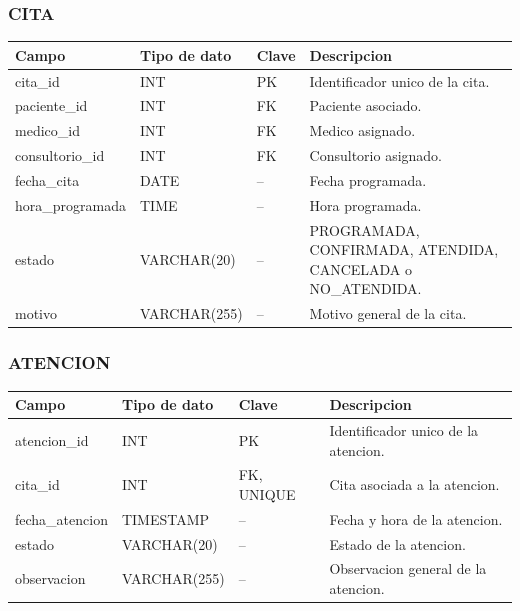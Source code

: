 \documentclass[11pt,letterpaper]{article}
\begin{document}
\subsubsection*{CITA}
\begin{center}
\small
\begin{tabularx}{\textwidth}{@{}p{3.2cm}p{3cm}p{2cm}Y@{}}
  \toprule
  \textbf{Campo} & \textbf{Tipo de dato} & \textbf{Clave} & \textbf{Descripcion} \\
  \midrule
  cita\_id & INT & PK & Identificador unico de la cita. \\
  paciente\_id & INT & FK & Paciente asociado. \\
  medico\_id & INT & FK & Medico asignado. \\
  consultorio\_id & INT & FK & Consultorio asignado. \\
  fecha\_cita & DATE & -- & Fecha programada. \\
  hora\_programada & TIME & -- & Hora programada. \\
  estado & VARCHAR(20) & -- & PROGRAMADA, CONFIRMADA, ATENDIDA, CANCELADA o NO\_ATENDIDA. \\
  motivo & VARCHAR(255) & -- & Motivo general de la cita. \\
  \bottomrule
\end{tabularx}
\end{center}

\subsubsection*{ATENCION}
\begin{center}
\small
\begin{tabularx}{\textwidth}{@{}p{3.2cm}p{3cm}p{2cm}Y@{}}
  \toprule
  \textbf{Campo} & \textbf{Tipo de dato} & \textbf{Clave} & \textbf{Descripcion} \\
  \midrule
  atencion\_id & INT & PK & Identificador unico de la atencion. \\
  cita\_id & INT & FK, UNIQUE & Cita asociada a la atencion. \\
  fecha\_atencion & TIMESTAMP & -- & Fecha y hora de la atencion. \\
  estado & VARCHAR(20) & -- & Estado de la atencion. \\
  observacion & VARCHAR(255) & -- & Observacion general de la atencion. \\
  \bottomrule
\end{tabularx}
\end{center}
\end{document}
